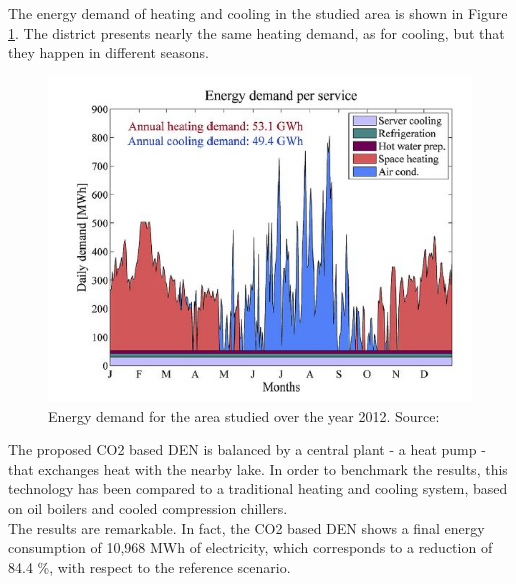 \documentclass{article}
\begin{document}


The energy demand of heating and cooling in the studied area is shown in Figure \ref{fig:henchoz_energydemand}. The district presents nearly the same heating demand, as for cooling, but that they happen in different seasons. 

\begin{figure}[h!]
\centering
\includegraphics[width=1\textwidth]{henchoz_energydemand.JPG}
\caption{Energy demand for the area studied over the year 2012. Source: \cite{henchozPotentialRefrigerantBased}}
\label{fig:henchoz_energydemand}
\end{figure}

The proposed CO2 based DEN is balanced by a central plant - a heat pump - that exchanges heat with the nearby lake. In order to benchmark the results, this technology has been compared to a traditional heating and cooling system, based on oil boilers and cooled compression chillers.\\
The results are remarkable. In fact, the CO2 based DEN shows a final energy consumption of 10,968 MWh of electricity, which corresponds to a reduction of 84.4 \%, with respect to the reference scenario. 
\end{document}
